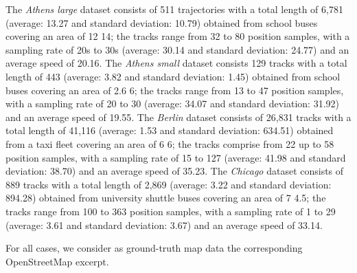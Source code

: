 \documentclass[natbib]{svjour3}                    \smartqed  \usepackage[table]{xcolor}
\begin{document}
The \emph{Athens large} dataset consists of 511 trajectories with a total length of 6,781 (average: 13.27 and standard deviation: 10.79) obtained from school buses covering an area of 12  14; the tracks range from 32 to 80 position samples, with a sampling rate of 20s to 30s (average: 30.14 and standard deviation: 24.77) and an average speed of 20.16.  
The \emph{Athens small} dataset consists 129 tracks with a total length of 443 (average: 3.82 and standard deviation: 1.45) obtained from school buses covering an area of 2.6  6; the tracks range from 13 to 47 position samples, with a sampling rate of 20 to 30 (average: 34.07 and standard deviation: 31.92) and an average speed of 19.55. 
The \emph{Berlin} dataset consists of 26,831 tracks with a total length of 41,116 (average: 1.53 and standard deviation: 634.51) obtained from a taxi fleet covering an area of 6  6; the tracks comprise from 22  up to 58 position samples, with a sampling rate of 15 to 127 (average: 41.98 and standard deviation: 38.70) and an average speed of 35.23. 
The \emph{Chicago} dataset \cite{be-irmgp-12,Biagioni:2012:MIF:2424321.2424333} consists of 889 tracks with a total length of 2,869 (average: 3.22 and standard deviation: 894.28) obtained from university shuttle buses covering an area of 7  4.5; the tracks range from 100 to 363 position samples, with a sampling rate of 1 to 29 (average: 3.61 and standard deviation: 3.67) and an average speed of 33.14. 

For all cases, we consider as ground-truth map data the corresponding OpenStreetMap excerpt. 
\end{document}
